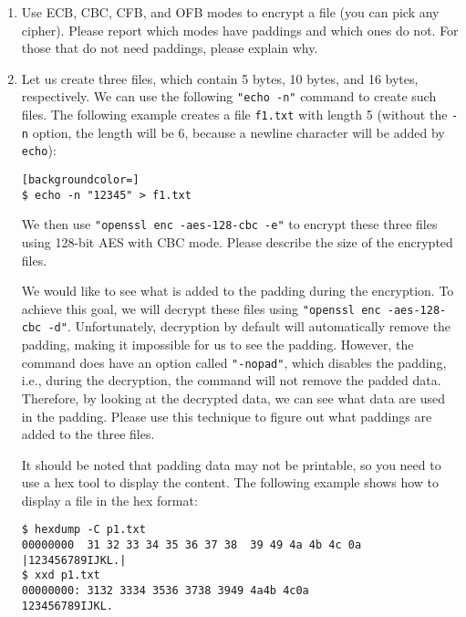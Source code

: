 \begin{enumerate}
\item Use ECB, CBC, CFB, and OFB modes to encrypt a file (you can pick
any cipher).  Please report which modes have paddings and which ones 
do not. For those that do not need paddings, please explain why.


\item Let us create three files, which contain 5 bytes, 10 bytes, and 16 bytes, respectively. 
We can use the following \texttt{"echo -n"} command to create such files. The following example
creates a file \texttt{f1.txt} with length 5 (without the \texttt{-n} option, the length will
be 6, because a newline character will be added by \texttt{echo}):  

\begin{lstlisting}[backgroundcolor=]
$ echo -n "12345" > f1.txt
\end{lstlisting}

We then use \texttt{"openssl enc -aes-128-cbc -e"} to encrypt these three files using 
128-bit AES with CBC mode.  Please describe
the size of the encrypted files. 

We would like to see what is added to the padding during the encryption. To achieve
this goal, we will decrypt these files using \texttt{"openssl enc -aes-128-cbc -d"}.
Unfortunately, decryption by default will automatically remove the padding, making it 
impossible for us to see the padding. However, the command does have an option called
\texttt{"-nopad"}, which disables the padding, i.e., during the decryption, the command will not 
remove the padded data. Therefore, by looking at the decrypted 
data, we can see what data are used in the padding. 
Please use this technique to figure out what paddings are added to the three files. 

It should be noted that padding data may not be printable, so you need to
use a hex tool to display the content. The following example shows 
how to display a file in the hex format:

\begin{lstlisting}
$ hexdump -C p1.txt
00000000  31 32 33 34 35 36 37 38  39 49 4a 4b 4c 0a   |123456789IJKL.|
$ xxd p1.txt
00000000: 3132 3334 3536 3738 3949 4a4b 4c0a            123456789IJKL.
\end{lstlisting}
 
\end{enumerate}



